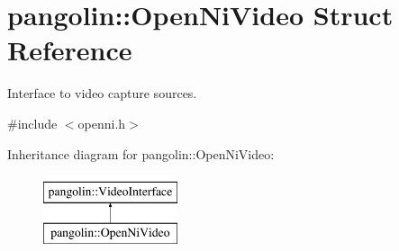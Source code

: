 \hypertarget{structpangolin_1_1_open_ni_video}{}\section{pangolin\+:\+:Open\+Ni\+Video Struct Reference}
\label{structpangolin_1_1_open_ni_video}


Interface to video capture sources.  




{\ttfamily \#include $<$openni.\+h$>$}

Inheritance diagram for pangolin\+:\+:Open\+Ni\+Video\+:\begin{figure}[H]
\begin{center}
\leavevmode
\includegraphics[height=2.000000cm]{structpangolin_1_1_open_ni_video}
\end{center}
\end{figure}
